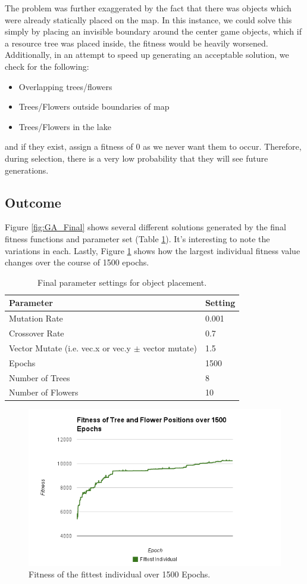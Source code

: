 The problem was further exaggerated by the fact that there was objects which were already statically placed on 
the map. In this instance, we could solve this simply by placing an invisible boundary around the center
game objects, which if a resource tree was placed inside, the fitness would be heavily worsened. Additionally,
in an attempt to speed up generating an acceptable solution, we check for the following:
\begin{itemize}
\item Overlapping trees/flowers
\item Trees/Flowers outside boundaries of map
\item Trees/Flowers in the lake
\end{itemize}
and if they exist, assign a fitness of 0 as we never want them to occur. Therefore, during selection, there is
a very low probability that they will see future generations.

\subsection{Outcome}
Figure \ref{fig:GA_Final} shows several different solutions generated by the final fitness functions and 
parameter set (Table \ref{table:params}).
It's interesting to note the variations in each. Lastly, Figure \ref{fig:fitnessOverTime} shows
how the largest individual fitness value changes over the course of 1500 epochs.

\begin{table}[h]
	\centering
    \begin{tabular}{ | l | l |}
    \hline
    Parameter & Setting \\ \hline
    Mutation Rate & 0.001    \\ \hline
    Crossover Rate & 0.7    \\ \hline
    Vector Mutate (i.e. vec.x or vec.y $\pm$ vector mutate) & 1.5    \\ \hline
    Epochs & 1500    \\ \hline
    Number of Trees & 8    \\ \hline
    Number of Flowers & 10    \\ \hline
    \end{tabular}
    \caption{Final parameter settings for object placement.}
    \label{table:params}
\end{table}

\begin{figure}[h]
\centering
\includegraphics[width=0.7\linewidth]{./timeFitness}
\caption{Fitness of the fittest individual over 1500 Epochs.}
\label{fig:fitnessOverTime}
\end{figure}


